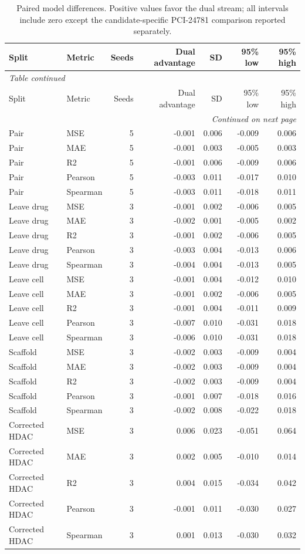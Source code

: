 \begingroup
\footnotesize
\begin{longtable}{@{}llrrrrr@{}}
\caption{Paired model differences. Positive values favor the dual stream; all intervals include zero except the candidate-specific PCI-24781 comparison reported separately.}\label{tab:s_paired}\\
\toprule
Split & Metric & Seeds & Dual advantage & SD & 95\% low & 95\% high \\
\midrule
\endfirsthead
\multicolumn{7}{l}{\textit{Table continued}}\\
\toprule
Split & Metric & Seeds & Dual advantage & SD & 95\% low & 95\% high \\
\midrule
\endhead
\midrule
\multicolumn{7}{r}{\textit{Continued on next page}}\\
\endfoot
\bottomrule
\endlastfoot
Pair & MSE & 5 & -0.001 & 0.006 & -0.009 & 0.006 \\
Pair & MAE & 5 & -0.001 & 0.003 & -0.005 & 0.003 \\
Pair & R2 & 5 & -0.001 & 0.006 & -0.009 & 0.006 \\
Pair & Pearson & 5 & -0.003 & 0.011 & -0.017 & 0.010 \\
Pair & Spearman & 5 & -0.003 & 0.011 & -0.018 & 0.011 \\
Leave drug & MSE & 3 & -0.001 & 0.002 & -0.006 & 0.005 \\
Leave drug & MAE & 3 & -0.002 & 0.001 & -0.005 & 0.002 \\
Leave drug & R2 & 3 & -0.001 & 0.002 & -0.006 & 0.005 \\
Leave drug & Pearson & 3 & -0.003 & 0.004 & -0.013 & 0.006 \\
Leave drug & Spearman & 3 & -0.004 & 0.004 & -0.013 & 0.005 \\
Leave cell & MSE & 3 & -0.001 & 0.004 & -0.012 & 0.010 \\
Leave cell & MAE & 3 & -0.001 & 0.002 & -0.006 & 0.005 \\
Leave cell & R2 & 3 & -0.001 & 0.004 & -0.011 & 0.009 \\
Leave cell & Pearson & 3 & -0.007 & 0.010 & -0.031 & 0.018 \\
Leave cell & Spearman & 3 & -0.006 & 0.010 & -0.031 & 0.018 \\
Scaffold & MSE & 3 & -0.002 & 0.003 & -0.009 & 0.004 \\
Scaffold & MAE & 3 & -0.002 & 0.003 & -0.009 & 0.004 \\
Scaffold & R2 & 3 & -0.002 & 0.003 & -0.009 & 0.004 \\
Scaffold & Pearson & 3 & -0.001 & 0.007 & -0.018 & 0.016 \\
Scaffold & Spearman & 3 & -0.002 & 0.008 & -0.022 & 0.018 \\
Corrected HDAC & MSE & 3 & 0.006 & 0.023 & -0.051 & 0.064 \\
Corrected HDAC & MAE & 3 & 0.002 & 0.005 & -0.010 & 0.014 \\
Corrected HDAC & R2 & 3 & 0.004 & 0.015 & -0.034 & 0.042 \\
Corrected HDAC & Pearson & 3 & -0.001 & 0.011 & -0.030 & 0.027 \\
Corrected HDAC & Spearman & 3 & 0.001 & 0.013 & -0.030 & 0.032 \\
\end{longtable}
\endgroup
